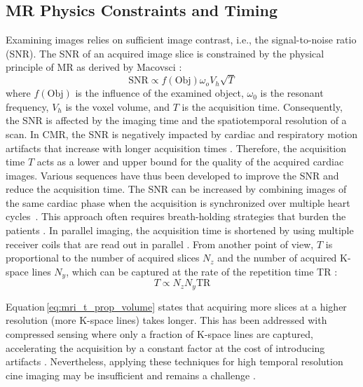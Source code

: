    \subsection{MR Physics Constraints and Timing}
   Examining images relies on sufficient image contrast, i.e., the signal-to-noise ratio (SNR). The SNR of an acquired image slice is constrained by the physical principle of MR as derived by Macovsci \cite{macovski1996noise}: %
        \begin{equation}
        \text{SNR} \propto f\left(\text{Obj}\right) \omega_o V_h \sqrt{T}
        \label{eq:mri_snr}
    \end{equation}
    where $f\left(\text{Obj}\right)$ is the influence of the examined object, $\omega_0$ is the resonant frequency, $V_h$ is the voxel volume, and $T$ is the acquisition time.
    Consequently, the SNR is affected by the imaging time and the spatiotemporal resolution of a scan.
    In CMR, the SNR is negatively impacted by cardiac and respiratory motion artifacts that increase with longer acquisition times \cite{ismail2022cardiac}.
    Therefore, the acquisition time $T$ acts as a lower and upper bound for the quality of the acquired cardiac images. Various sequences have thus been developed to improve the SNR and reduce the acquisition time.
    The SNR can be increased by combining images of the same cardiac phase when the acquisition is synchronized over multiple heart cycles~\cite{ismail2022cardiac}. This approach often requires breath-holding strategies that burden the patients \cite{ridgway2010cardiovascular}.
    In parallel imaging, the acquisition time is shortened by using
    multiple receiver coils that are read out in parallel \cite{pruessmann1999sense, griswold2002generalized,ridgway2010cardiovascular}.
    From another point of view, $T$ is proportional to the number of acquired slices $N_z$ and the number of acquired K-space lines $N_y$, which can be captured at the rate of the repetition time TR \cite{balaban2019basic}:
    \begin{equation}
        T \propto  N_z N_y \text{TR}
        \label{eq:mri_t_prop_volume}
    \end{equation}

    Equation\,\eqref{eq:mri_t_prop_volume} states that acquiring more slices at a higher resolution (more K-space lines) takes longer. This has been addressed with compressed sensing where only a fraction of K-space lines are captured, accelerating the acquisition by a constant factor at the cost of introducing artifacts \cite{lustig2007sparse}.
    Nevertheless, applying these techniques for high temporal resolution cine imaging may be insufficient and remains a challenge \cite{raman202230}.

